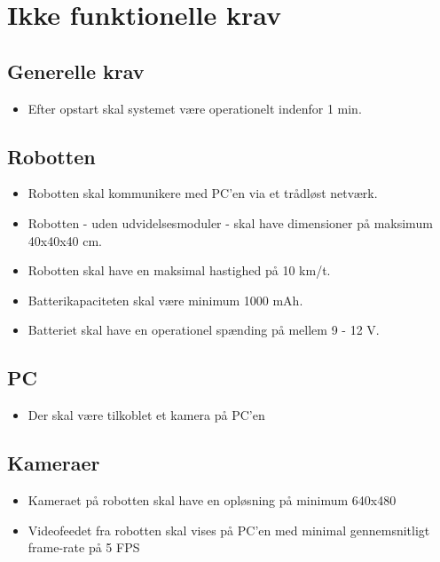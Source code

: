 \chapter{Ikke funktionelle krav}
\label{appendix:Ikke_funktionelle_krav}

\section{Generelle krav}
\begin{itemize}
	\item Efter opstart skal systemet være operationelt indenfor 1 min.
\end{itemize}

\section{Robotten}
\begin{itemize}
	\item Robotten skal kommunikere med PC'en via et trådløst netværk.
	\item Robotten - uden udvidelsesmoduler - skal have dimensioner på maksimum 40x40x40 cm.
	\item Robotten skal have en maksimal hastighed på 10 km/t.
	\item Batterikapaciteten skal være minimum 1000 mAh.
	\item Batteriet skal have en operationel spænding på mellem 9 - 12 V.
\end{itemize}

\section{PC}
\begin{itemize}
	\item Der skal være tilkoblet et kamera på PC'en
\end{itemize}

\section{Kameraer}
\begin{itemize}
	\item Kameraet på robotten skal have en opløsning på minimum 640x480 
\end{itemize}
\begin{itemize}
	\item Videofeedet fra robotten skal vises på PC'en med minimal gennemsnitligt frame-rate på 5 FPS
\end{itemize}

